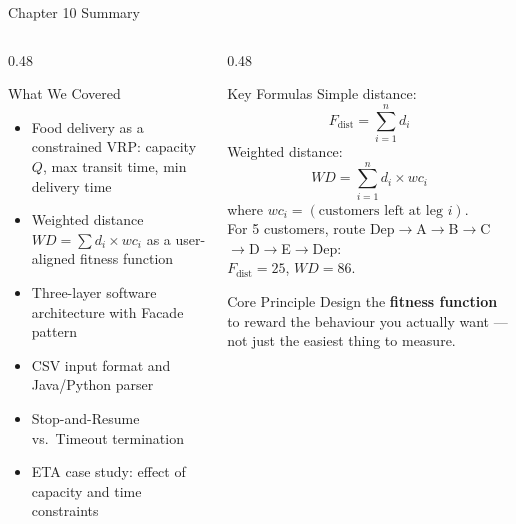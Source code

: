 \documentclass[aspectratio=169,10pt]{beamer}
\begin{document}
\begin{frame}{Chapter 10 Summary}

  \begin{columns}[T]
    \begin{column}{0.48\textwidth}
      \begin{block}{What We Covered}
        \begin{itemize}
          \item Food delivery as a constrained VRP: capacity $Q$,
                max transit time, min delivery time
          \item Weighted distance $WD = \sum d_i \times wc_i$
                as a user-aligned fitness function
          \item Three-layer software architecture with Facade pattern
          \item CSV input format and Java/Python parser
          \item Stop-and-Resume vs.\ Timeout termination
          \item ETA case study: effect of capacity and time constraints
        \end{itemize}
      \end{block}
    \end{column}
    \begin{column}{0.48\textwidth}
      \begin{block}{Key Formulas}
        Simple distance:
        \[F_{\text{dist}} = \sum_{i=1}^{n} d_i\]
        Weighted distance:
        \[WD = \sum_{i=1}^{n} d_i \times wc_i\]
        where $wc_i = (\text{customers left at leg } i)$.
        \\[6pt]
        For 5 customers, route Dep$\to$A$\to$B$\to$C$\to$D$\to$E$\to$Dep:\\
        $F_{\text{dist}} = 25$, $WD = 86$.
      \end{block}

      \begin{alertblock}{Core Principle}
        Design the \textbf{fitness function} to reward the behaviour
        you actually want — not just the easiest thing to measure.
      \end{alertblock}
    \end{column}
  \end{columns}

\end{frame}
\end{document}
